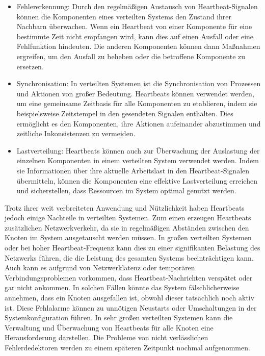 \documentclass[../vs-script-first-v01.tex]{subfiles}
\begin{document}
\begin{itemize}
\item Fehlererkennung: Durch den regelmäßigen Austausch von Heartbeat-Signalen können die Komponenten eines verteilten Systems den Zustand ihrer Nachbarn überwachen. Wenn ein Heartbeat von einer Komponente für eine bestimmte Zeit nicht empfangen wird, kann dies auf einen Ausfall oder eine Fehlfunktion hindeuten. Die anderen Komponenten können dann Maßnahmen ergreifen, um den Ausfall zu beheben oder die betroffene Komponente zu ersetzen.
\item Synchronisation: In verteilten Systemen ist die Synchronisation von Prozessen und Aktionen von großer Bedeutung. Heartbeats können verwendet werden, um eine gemeinsame Zeitbasis für alle Komponenten zu etablieren, indem sie beispielsweise Zeitstempel in den gesendeten Signalen enthalten. Dies ermöglicht es den Komponenten, ihre Aktionen aufeinander abzustimmen und zeitliche Inkonsistenzen zu vermeiden.
\item Lastverteilung: Heartbeats können auch zur Überwachung der Auslastung der einzelnen Komponenten in einem verteilten System verwendet werden. Indem sie Informationen über ihre aktuelle Arbeitslast in den Heartbeat-Signalen übermitteln, können die Komponenten eine effektive Lastverteilung erreichen und sicherstellen, dass Ressourcen im System optimal genutzt werden.
\end{itemize}
Trotz ihrer weit verbreiteten Anwendung und Nützlichkeit haben Heartbeats jedoch einige Nachteile in verteilten Systemen. Zum einen erzeugen Heartbeats zusätzlichen Netzwerkverkehr, da sie in regelmäßigen Abständen zwischen den Knoten im System ausgetauscht werden müssen. In großen verteilten Systemen oder bei hoher Heartbeat-Frequenz kann dies zu einer signifikanten Belastung des Netzwerks führen, die die Leistung des gesamten Systems beeinträchtigen kann. Auch kann es aufgrund von Netzwerklatenz oder temporären Verbindungsproblemen vorkommen, dass Heartbeat-Nachrichten verspätet oder gar nicht ankommen. In solchen Fällen könnte das System fälschlicherweise annehmen, dass ein Knoten ausgefallen ist, obwohl dieser tatsächlich noch aktiv ist. Diese Fehlalarme können zu unnötigen Neustarts oder Umschaltungen in der Systemkonfiguration führen.
In sehr großen verteilten Systemen kann die Verwaltung und Überwachung von Heartbeats für alle Knoten eine Herausforderung darstellen.
Die Probleme von nicht verlässlichen Fehlerdedektoren werden zu einem späteren Zeitpunkt nochmal aufgenommen. 
\\\\
\end{document}
